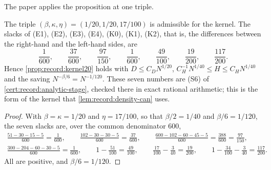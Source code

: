 The paper applies the proposition at one triple.

\begin{corollary}[The kernel at $\beta=1/20$]\label{cor:kernel20}
The triple $(\beta,\kappa,\eta)=(1/20,1/20,17/100)$ is admissible for the
kernel. The slacks of (E1), (E2), (E3), (E4), (K0), (K1), (K2), that is, the
differences between the right-hand and the left-hand sides, are
\[
 \frac1{600},\qquad\frac{37}{600},\qquad\frac{97}{150},\qquad\frac1{600},
 \qquad\frac{49}{100},\qquad\frac{19}{200},\qquad\frac{117}{200}.
\]
Hence \cref{prop:record:kernel20} holds with $D\le C_DN^{1/20}$,
$C_H^{-1}N^{1/40}\le H\le C_HN^{1/40}$ and the saving $N^{-\beta/6}=N^{-1/120}$.
These seven numbers are (S6) of \cref{cert:record:analytic-stage}, checked
there in exact rational arithmetic; this is the form of the kernel that
\cref{lem:record:density-can} uses.
\end{corollary}

\begin{proof}
With $\beta=\kappa=1/20$ and $\eta=17/100$, so that $\beta/2=1/40$ and
$\beta/6=1/120$, the seven slacks are, over the common denominator $600$,
\begin{gather*}
 \tfrac{51-30-15-5}{600}=\tfrac1{600},\qquad
 \tfrac{102-30-30-5}{600}=\tfrac{37}{600},\qquad
 \tfrac{600-102-60-45-5}{600}=\tfrac{388}{600}=\tfrac{97}{150},\\
 \tfrac{300-204-60-30-5}{600}=\tfrac1{600},\qquad
 1-\tfrac{51}{100}=\tfrac{49}{100},\qquad
 \tfrac{17}{100}-\tfrac3{40}=\tfrac{19}{200},\qquad
 1-\tfrac{34}{100}-\tfrac3{40}=\tfrac{117}{200}.
\end{gather*}
All are positive, and $\beta/6=1/120$.
\end{proof}

